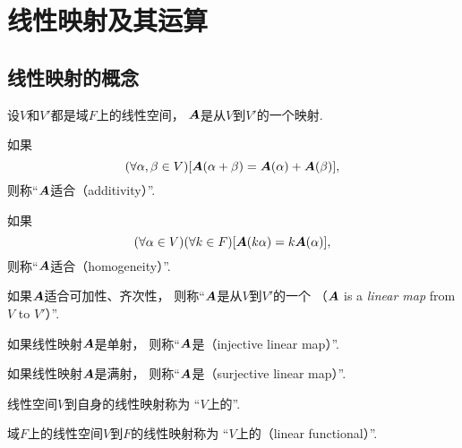 \section{线性映射及其运算}
\subsection{线性映射的概念}
\begin{definition}
设\(V\)和\(V'\)都是域\(F\)上的线性空间，
\(\boldsymbol{A}\)是从\(V\)到\(V'\)的一个映射.

如果\begin{equation*}
	(\forall\alpha,\beta\in V)
	[\boldsymbol{A}(\alpha+\beta)=\boldsymbol{A}(\alpha)+\boldsymbol{A}(\beta)],
\end{equation*}
则称“\(\boldsymbol{A}\)适合（additivity）”.

如果\begin{equation*}
	(\forall\alpha\in V)
	(\forall k\in F)
	[\boldsymbol{A}(k\alpha)=k\boldsymbol{A}(\alpha)],
\end{equation*}
则称“\(\boldsymbol{A}\)适合（homogeneity）”.

如果\(\boldsymbol{A}\)适合可加性、齐次性，
则称“\(\boldsymbol{A}\)是从\(V\)到\(V'\)的一个%
（\(\boldsymbol{A}\) is a \emph{linear map} from \(V\) to \(V'\)）”.
\end{definition}

\begin{definition}
如果线性映射\(\boldsymbol{A}\)是单射，
则称“\(\boldsymbol{A}\)是（injective linear map）”.
\end{definition}

\begin{definition}
如果线性映射\(\boldsymbol{A}\)是满射，
则称“\(\boldsymbol{A}\)是（surjective linear map）”.
\end{definition}

\begin{definition}
线性空间\(V\)到自身的线性映射称为
“\(V\)上的”.
\end{definition}

\begin{definition}\label{definition:线性映射.线性函数}
域\(F\)上的线性空间\(V\)到\(F\)的线性映射称为
“\(V\)上的（linear functional）”.
\end{definition}

